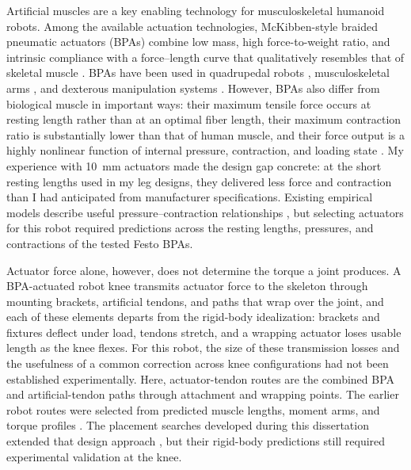 Artificial muscles are a key enabling technology for musculoskeletal humanoid robots. Among the available actuation technologies, McKibben-style braided pneumatic actuators (BPAs) combine low mass, high force-to-weight ratio, and intrinsic compliance with a force--length curve that qualitatively resembles that of skeletal muscle \citep{liang_comparative_2020, hunt_modeling_2017}. BPAs have been used in quadrupedal robots \citep{aschenbeck_design_2006, hunt_modeling_2017, scharzenberger_design_2019}, musculoskeletal arms \citep{hitzmann_anthropomorphic_2018, kurumaya_musculoskeletal_2016}, and dexterous manipulation systems \citep{chen_realizing_2019}. However, BPAs also differ from biological muscle in important ways: their maximum tensile force occurs at resting length rather than at an optimal fiber length, their maximum contraction ratio is substantially lower than that of human muscle, and their force output is a highly nonlinear function of internal pressure, contraction, and loading state \citep{hunt_modeling_2017, sarosi_comparative_2017, liang_comparative_2020}. My experience with \qty{10}{\mm} actuators made the design gap concrete: at the short resting lengths used in my leg designs, they delivered less force and contraction than I had anticipated from manufacturer specifications. Existing empirical models describe useful pressure--contraction relationships \citep{sarosi_comparative_2017, martens_modeling_2017, hunt_modeling_2017}, but selecting actuators for this robot required predictions across the resting lengths, pressures, and contractions of the tested Festo BPAs.

Actuator force alone, however, does not determine the torque a joint produces. A BPA-actuated robot knee transmits actuator force to the skeleton through mounting brackets, artificial tendons, and paths that wrap over the joint, and each of these elements departs from the rigid-body idealization: brackets and fixtures deflect under load, tendons stretch, and a wrapping actuator loses usable length as the knee flexes. For this robot, the size of these transmission losses and the usefulness of a common correction across knee configurations had not been established experimentally. Here, actuator-tendon routes are the combined BPA and artificial-tendon paths through attachment and wrapping points. The earlier robot routes were selected from predicted muscle lengths, moment arms, and torque profiles \citep{bolen_determination_2019}. The placement searches developed during this dissertation extended that design approach \citep{morrow_optimization_2020}, but their rigid-body predictions still required experimental validation at the knee.

